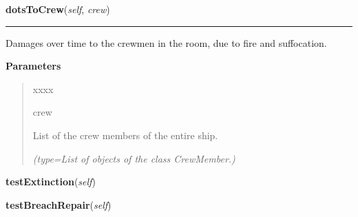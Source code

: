 \hspace{.8\funcindent}\begin{boxedminipage}{\funcwidth}

    \raggedright \textbf{dotsToCrew}(\textit{self}, \textit{crew})

    \vspace{-1.5ex}

    \rule{\textwidth}{0.5\fboxrule}
\setlength{\parskip}{2ex}
    Damages over time to the crewmen in the room, due to fire and 
    suffocation.

\setlength{\parskip}{1ex}
      \textbf{Parameters}
      \vspace{-1ex}

      \begin{quote}
        \begin{Ventry}{xxxx}

          \item[crew]

          List of the crew members of the entire ship.

            {\it (type=List of objects of the class CrewMember.)}

        \end{Ventry}

      \end{quote}

    \end{boxedminipage}

    \label{room:Room:testExtinction}

    \vspace{0.5ex}

\hspace{.8\funcindent}\begin{boxedminipage}{\funcwidth}

    \raggedright \textbf{testExtinction}(\textit{self})

\setlength{\parskip}{2ex}
\setlength{\parskip}{1ex}
    \end{boxedminipage}

    \label{room:Room:testBreachRepair}

    \vspace{0.5ex}

\hspace{.8\funcindent}\begin{boxedminipage}{\funcwidth}

    \raggedright \textbf{testBreachRepair}(\textit{self})

\setlength{\parskip}{2ex}
\setlength{\parskip}{1ex}
    \end{boxedminipage}

